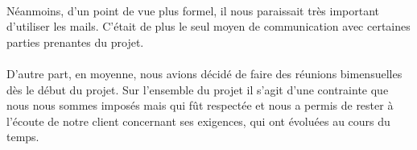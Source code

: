         \paragraph{}
        Néanmoins, d'un point de vue plus formel, il nous paraissait très important d'utiliser les mails. C'était de plus le seul moyen de communication avec certaines parties prenantes du projet.

        \paragraph{}
        D'autre part, en moyenne, nous avions décidé de faire des réunions bimensuelles dès le début du projet. Sur l'ensemble du projet il s'agit d'une contrainte que nous nous sommes imposés mais qui fût respectée et nous a permis de rester à l'écoute de notre client concernant ses exigences, qui ont évoluées au cours du temps.

